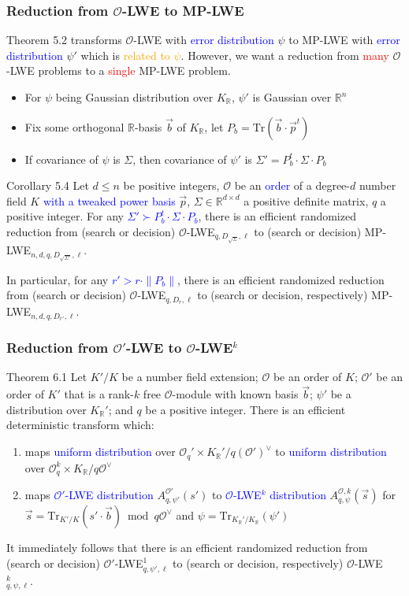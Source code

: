 \documentclass{beamer}
\newcommand{\blue}[1]{\textcolor{blue}{#1}}
\newcommand{\dgreen}[1]{\textcolor{dgreen}{#1}}
\newcommand{\orange}[1]{\textcolor{orange}{#1}}
\newcommand{\red}[1]{\textcolor{red}{#1}}
\newcommand{\cO}{\mathcal{O}}
\newcommand{\bbR}{\mathbb{R}}
\newcommand{\Tr}{\mathrm{Tr}}
\newcommand{\cOV}{\mathcal{O}^{\vee}}
\newcommand{\cOpV}{(\mathcal{O'})^{\vee}}
\newcommand{\KR}{K_{\mathbb{R}}}
\newcommand{\vb}{\vec{b}}
\newcommand{\vp}{\vec{p}}
\newcommand{\vs}{\vec{s}}
\begin{document}
\frame
{
  \frametitle{Reduction from $\cO$-LWE to MP-LWE}
  Theorem 5.2 transforms $\cO$-LWE with \blue{error distribution} $\psi$ to MP-LWE with \blue{error distribution} $\psi'$ which is \orange{related to $\psi$}. However, we want a reduction from \red{many} $\cO$-LWE problems to a \red{single} MP-LWE problem.
  \begin{itemize}
  	\item For $\psi$ being Gaussian distribution over $\KR$, $\psi'$ is Gaussian over $\bbR^n$
  	\item Fix some orthogonal $\bbR$-basis $\vb$ of $\KR$, let $P_b=\Tr(\vb\cdot\vp^t)$
  	\item If covariance of $\psi$ is $\Sigma$, then covariance of $\psi'$ is $\Sigma'=P_b^t\cdot\Sigma\cdot P_b$
  \end{itemize}
  \begin{block}{Corollary 5.4}
  Let $d\leq n$ be positive integers, $\cO$ be an \blue{order} of a degree-$d$ number field $K$ \blue{with a tweaked power basis} $\vp$, $\Sigma\in\bbR^{d\times d}$ a positive definite matrix, $q$ a positive integer. For any \blue{$\Sigma'\succ P_b^t\cdot\Sigma\cdot P_b$}, there is an \dgreen{efficient randomized reduction} from (search or decision) $\cO$-LWE$_{q,D_{\sqrt{\Sigma}},\ell}$ to (search or decision) MP-LWE$_{n,d,q,D_{\sqrt{\Sigma'}},\ell}$.

  In particular, for any \blue{$r'>r\cdot\|P_b\|$}, there is an \dgreen{efficient randomized reduction} from (search or decision) $\cO$-LWE$_{q,D_r,\ell}$ to (search or decision, respectively) MP-LWE$_{n,d,q,D_{r'},\ell}$.
  \end{block}
}

\frame
{
  \frametitle{Reduction from $\cO'$-LWE to $\cO$-LWE$^k$}
  \begin{block}{Theorem 6.1}
  Let $K'/K$ be a number field extension; $\cO$ be an order of $K$; $\cO'$ be an order of $K'$ that is a rank-$k$ free $\cO$-module with known basis $\vb$; $\psi'$ be a distribution over $\KR'$; and $q$ be a positive integer. There is an \dgreen{efficient deterministic transform} which:
	\begin{enumerate}
		\item maps \blue{uniform distribution} over $\cO_q'\times\KR'/q\cOpV$ to \blue{uniform distribution} over $\cO_q^k\times\KR/q\cOV$
		\item maps \blue{$\cO'$-LWE distribution} $A_{q,\psi'}^{\cO'}(s')$ to \blue{$\cO$-LWE$^k$ distribution} $A_{q,\psi}^{\cO,k}(\vs)$ for $\vs=\Tr_{K'/K}(s'\cdot\vb)\bmod q\cOV$ and $\psi=\Tr_{\KR'/\KR}(\psi')$
	\end{enumerate}
	It immediately follows that there is an \dgreen{efficient randomized reduction} from (search or decision) $\cO'$-LWE$_{q,\psi',\ell}^1$ to (search or decision, respectively) $\cO$-LWE$_{q,\psi,\ell}^k$.
  \end{block}
}
\end{document}
